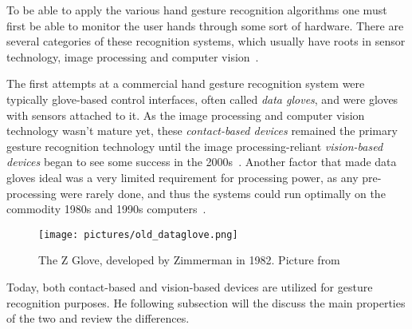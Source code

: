 To be able to apply the various hand gesture recognition algorithms one must first be able to monitor the user hands through some sort of hardware. 
There are several categories of these recognition systems, which usually have roots in sensor technology, 
image processing and computer vision~\citep{Vafadar2014}.

The first attempts at a commercial hand gesture recognition system were typically glove-based control interfaces, often called \textit{data gloves},
and were gloves with sensors attached to it. As the image processing and computer vision technology wasn't mature yet, these \textit{contact-based devices} remained 
the primary gesture recognition technology until the image processing-reliant \textit{vision-based devices} began to see some success in the 2000s~\citep{Premaratne2014}.
Another factor that made data gloves ideal was a very limited requirement for processing power, as any pre-processing were rarely done, 
and thus the systems could run optimally on the commodity 1980s and 1990s computers~\citep{Premaratne2014}.  


\begin{figure}%
	\texttt{[image: pictures/old\_dataglove.png]}
	\caption[The Z Glove]{The Z Glove, developed by Zimmerman in 1982. Picture from \citet{Premaratne2014}}
	\label{fig:old_dataglove}
\end{figure} 

Today, both contact-based and vision-based devices are utilized for gesture recognition purposes. 
He following subsection will the discuss the main properties of the two and review the differences.

